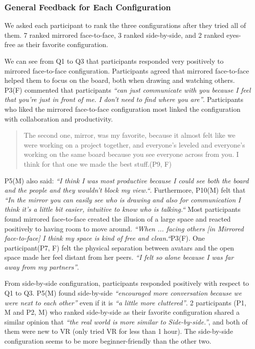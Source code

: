 \documentclass[chi_draft]{sigchi}
\begin{document}
\subsubsection{General Feedback for Each Configuration}

We asked each participant to rank the three configurations after they tried all of them. 7 ranked mirrored face-to-face, 3 ranked side-by-side, and 2 ranked eyes-free as their favorite configuration.

We can see from Q1 to Q3 that participants responded very positively to mirrored face-to-face configuration.
Participants agreed that mirrored face-to-face helped them to focus on the board, both when drawing and watching others. P3(F) commented that participants \textit{``can just communicate with you because I feel that you're just in front of me. I don't need to find where you are''}. 
Participants who liked the mirrored face-to-face configuration most linked the configuration with collaboration and productivity.
\begin{quote}
    The second one, mirror, was my favorite, because it almost felt like we were working on a project together, and everyone's leveled and everyone's working on the same board because you see everyone across from you. I think for that one we made the best stuff.(P9, F)
\end{quote}
P5(M) also said: \textit{``I think I was most productive because I could see both the board and the people and they wouldn't block my view.``}. Furthermore, P10(M) felt that \textit{``In the mirror you can easily see who is drawing and also for communication I think it's a little bit easier, intuitive to know who is talking.``} 
%
Most participants found mirrored face-to-face created the illusion of a large space and reacted positively to having room to move around. \textit{``When ... facing others [in Mirrored face-to-face] I think my space is kind of free and clean.``}P3(F). One participant(P7, F) felt the physical separation between avatars and the open space made her feel distant from her peers. \textit{``I felt so alone because I was far away from my partners''}.

From side-by-side configuration, participants responded positively with respect to Q1 to Q3. 
P5(M) found side-by-side \textit{``encouraged more conversation because we were next to each other''} even if it is \textit{``a little more cluttered''}.
2 participants (P1, M and P2, M) who ranked side-by-side as their favorite configuration shared a similar opinion that \textit{``the real world is more similar to Side-by-side.''}, and both of them were new to VR (only tried VR for less than 1 hour). The side-by-side configuration seems to be more beginner-friendly than the other two. 
\end{document}
